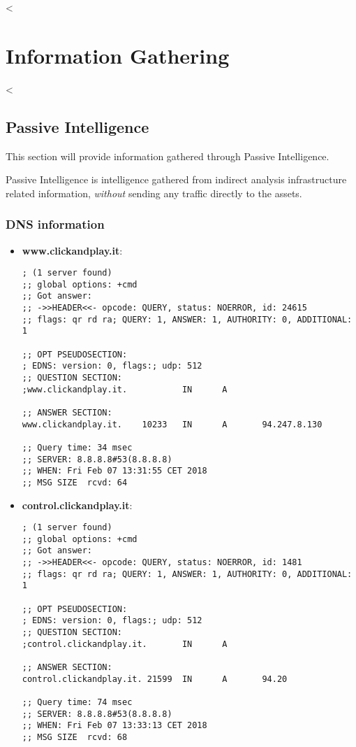 

<%


\chapter{Information Gathering}\label{ch:infogath}

  <%

  \section {Passive Intelligence}\label{sec:passiveint}

    This section will provide information gathered through Passive Intelligence.

    Passive Intelligence is intelligence gathered from indirect analysis
    infrastructure related information, \textit{without} sending any traffic
    directly to the assets.

    \subsection{DNS information}\label{sub:dnsinfo}

      \begin{itemize}
        \item \textbf{www.clickandplay.it}:
          \begin{verbatim}
; (1 server found)
;; global options: +cmd
;; Got answer:
;; ->>HEADER<<- opcode: QUERY, status: NOERROR, id: 24615
;; flags: qr rd ra; QUERY: 1, ANSWER: 1, AUTHORITY: 0, ADDITIONAL: 1

;; OPT PSEUDOSECTION:
; EDNS: version: 0, flags:; udp: 512
;; QUESTION SECTION:
;www.clickandplay.it.           IN      A

;; ANSWER SECTION:
www.clickandplay.it.    10233   IN      A       94.247.8.130

;; Query time: 34 msec
;; SERVER: 8.8.8.8#53(8.8.8.8)
;; WHEN: Fri Feb 07 13:31:55 CET 2018
;; MSG SIZE  rcvd: 64
          \end{verbatim}
        \item \textbf{control.clickandplay.it}:
          \begin{verbatim}
; (1 server found)
;; global options: +cmd
;; Got answer:
;; ->>HEADER<<- opcode: QUERY, status: NOERROR, id: 1481
;; flags: qr rd ra; QUERY: 1, ANSWER: 1, AUTHORITY: 0, ADDITIONAL: 1

;; OPT PSEUDOSECTION:
; EDNS: version: 0, flags:; udp: 512
;; QUESTION SECTION:
;control.clickandplay.it.       IN      A

;; ANSWER SECTION:
control.clickandplay.it. 21599  IN      A       94.20

;; Query time: 74 msec
;; SERVER: 8.8.8.8#53(8.8.8.8)
;; WHEN: Fri Feb 07 13:33:13 CET 2018
;; MSG SIZE  rcvd: 68
          \end{verbatim}
      \end{itemize}

